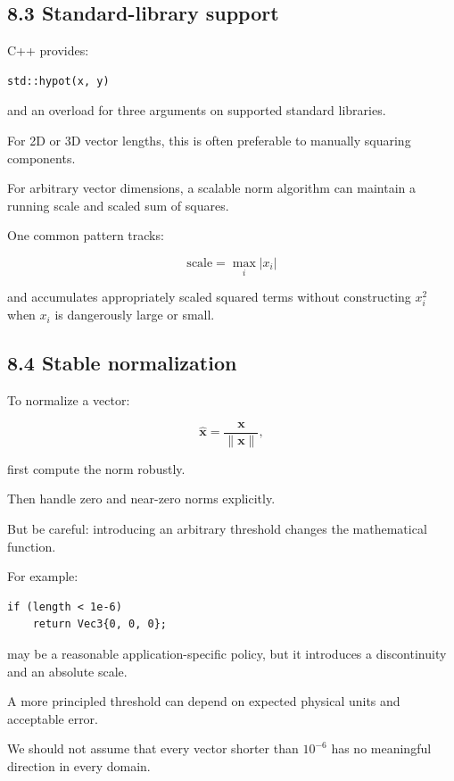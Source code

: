 \subsection{8.3 Standard-library support}\label{02-foundations-ii-ch028-standard-library-support}

C++ provides:

\begin{verbatim}
std::hypot(x, y)
\end{verbatim}

and an overload for three arguments on supported standard libraries.

For 2D or 3D vector lengths, this is often preferable to manually squaring components.

For arbitrary vector dimensions, a scalable norm algorithm can maintain a running scale and scaled sum of squares.

One common pattern tracks:

\[ \text{scale}=\max_i|x_i| \]

and accumulates appropriately scaled squared terms without constructing \(x_i^2\) when \(x_i\) is dangerously large or small.

\subsection{8.4 Stable normalization}\label{02-foundations-ii-ch028-stable-normalization}

To normalize a vector:

\[ \hat{\mathbf x}= \frac{\mathbf x}{\|\mathbf x\|}, \]

first compute the norm robustly.

Then handle zero and near-zero norms explicitly.

But be careful: introducing an arbitrary threshold changes the mathematical function.

For example:

\begin{verbatim}
if (length < 1e-6)
    return Vec3{0, 0, 0};
\end{verbatim}

may be a reasonable application-specific policy, but it introduces a discontinuity and an absolute scale.

A more principled threshold can depend on expected physical units and acceptable error.

We should not assume that every vector shorter than \(10^{-6}\) has no meaningful direction in every domain.

